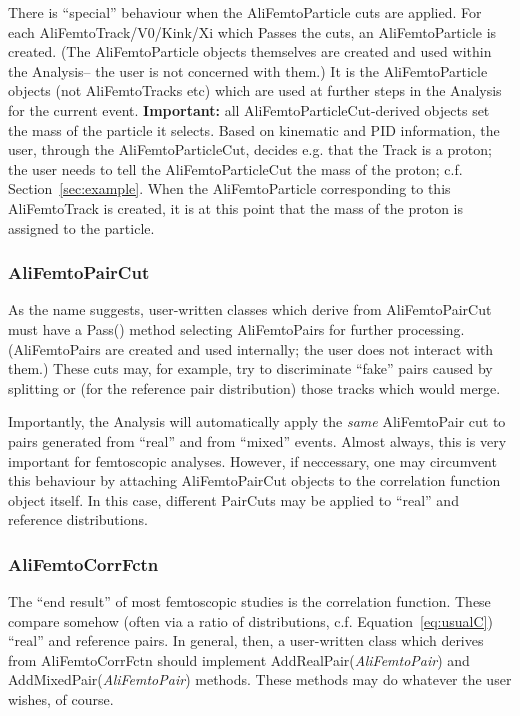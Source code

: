 \documentclass[twoside]{article}
\newcommand{\name}[1]{\textsf{#1}}%
\newcommand{\args}[1]{\textit{#1}}%
\newcommand{\meth}[1]{\textsf{#1}}%
\begin{document}
There is ``special'' behaviour when the \name{AliFemtoParticle} cuts are applied.  For each AliFemtoTrack/V0/Kink/Xi which Passes the cuts,
an \name{AliFemtoParticle} is created.  (The \name{AliFemtoParticle} objects themselves
are created and used within the Analysis-- the user is not concerned with them.)
It is the \name{AliFemtoParticle} objects (not \name{AliFemtoTracks} etc) which are used at further steps in the Analysis
for the current event.  {\bf Important:} all \name{AliFemtoParticleCut}-derived objects set the mass of the particle it selects.  Based on
kinematic and PID information, the user, through the \name{AliFemtoParticleCut}, decides e.g. that the Track is a proton; the user needs to
tell the \name{AliFemtoParticleCut} the mass of the proton; c.f. Section~\ref{sec:example}.  When the \name{AliFemtoParticle} corresponding to this
\name{AliFemtoTrack} is created, it is at this point that the mass of the proton is assigned to the particle.

\subsubsection{AliFemtoPairCut}

As the name suggests, user-written classes which derive from \name{AliFemtoPairCut} must have a \meth{Pass()} method selecting
\name{AliFemtoPairs} for further processing.  (\name{AliFemtoPair}s are created and used internally; the user does not interact with them.)
These cuts may, for example, try to discriminate ``fake'' pairs caused by splitting or (for the reference pair distribution)
those tracks which would merge.

Importantly, the Analysis will automatically apply the {\it same} \name{AliFemtoPair} cut to pairs generated from ``real'' and from ``mixed''
events.  Almost always, this is very important for femtoscopic analyses.  However, if neccessary, one may circumvent this behaviour
by attaching \name{AliFemtoPairCut} objects to the correlation function object itself.  In this case, different PairCuts may be applied to ``real'' and
reference distributions.

\subsubsection{AliFemtoCorrFctn}

The ``end result'' of most femtoscopic studies is the correlation function.  These compare somehow (often via a ratio of
distributions, c.f. Equation~\ref{eq:usualC}) ``real'' and reference pairs.  In general, then, a user-written class which
derives from \name{AliFemtoCorrFctn} should implement \meth{AddRealPair(\args{AliFemtoPair})} and \meth{AddMixedPair(\args{AliFemtoPair})}
methods.  These methods may do whatever the user
wishes, of course.
\end{document}
